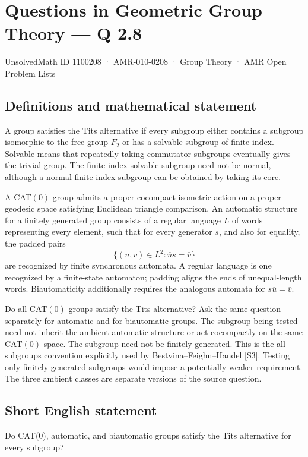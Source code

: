 \documentclass[11pt,a4paper]{article}
\begin{document}
\section*{Questions in Geometric Group Theory — Q 2.8}\label{1100208}
{\small UnsolvedMath ID 1100208 · AMR-010-0208 · Group Theory · AMR Open Problem Lists}
\subsection{Definitions and mathematical statement}
A group satisfies the Tits alternative if every subgroup either contains a subgroup isomorphic to the free group $F_2$ or has a solvable subgroup of finite index. Solvable means that repeatedly taking commutator subgroups eventually gives the trivial group. The finite-index solvable subgroup need not be normal, although a normal finite-index subgroup can be obtained by taking its core.

A CAT$(0)$ group admits a proper cocompact isometric action on a proper geodesic space satisfying Euclidean triangle comparison. An automatic structure for a finitely generated group consists of a regular language $L$ of words representing every element, such that for every generator $s$, and also for equality, the padded pairs
\[
 \{(u,v)\in L^2:\overline u s=\overline v\}
\]
are recognized by finite synchronous automata. A regular language is one recognized by a finite-state automaton; padding aligns the ends of unequal-length words. Biautomaticity additionally requires the analogous automata for $s\overline u=\overline v$.

Do all CAT$(0)$ groups satisfy the Tits alternative? Ask the same question separately for automatic and for biautomatic groups. The subgroup being tested need not inherit the ambient automatic structure or act cocompactly on the same CAT$(0)$ space. The subgroup need not be finitely generated. This is the all-subgroups convention explicitly used by Bestvina--Feighn--Handel [S3]. Testing only finitely generated subgroups would impose a potentially weaker requirement. The three ambient classes are separate versions of the source question.
\subsection{Short English statement}
Do CAT(0), automatic, and biautomatic groups satisfy the Tits alternative for every subgroup?
\end{document}
